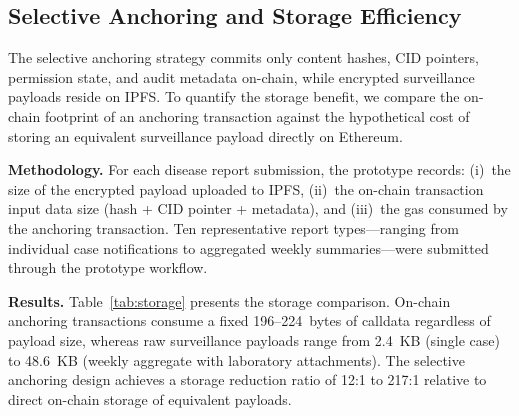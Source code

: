 %
%
%
%

\subsection{Selective Anchoring and Storage Efficiency}\label{subsec:anchoring_eval}

The selective anchoring strategy commits only content hashes, CID pointers, permission state, and audit metadata on-chain, while encrypted surveillance payloads reside on IPFS. To quantify the storage benefit, we compare the on-chain footprint of an anchoring transaction against the hypothetical cost of storing an equivalent surveillance payload directly on Ethereum.

\textbf{Methodology.} For each disease report submission, the prototype records: (i)~the size of the encrypted payload uploaded to IPFS, (ii)~the on-chain transaction input data size (hash + CID pointer + metadata), and (iii)~the gas consumed by the anchoring transaction. Ten representative report types---ranging from individual case notifications to aggregated weekly summaries---were submitted through the prototype workflow.

\textbf{Results.} Table~\ref{tab:storage} presents the storage comparison. On-chain anchoring transactions consume a fixed 196--224~bytes of calldata regardless of payload size, whereas raw surveillance payloads range from 2.4~KB (single case) to 48.6~KB (weekly aggregate with laboratory attachments). The selective anchoring design achieves a storage reduction ratio of 12:1 to 217:1 relative to direct on-chain storage of equivalent payloads.

